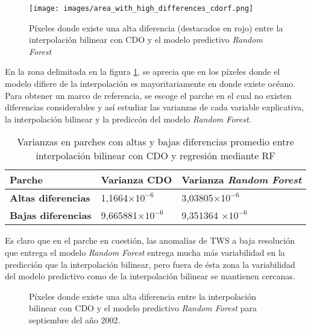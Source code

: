 \begin{figure}[H]
    \centering
          \texttt{[image: images/area\_with\_high\_differences\_cdorf.png]}
          \vskip -0.1in
    \caption[Área donde la interpolación bilinear y el modelo predictivo difieren considerablemente]{Píxeles donde existe una alta diferencia (destacados en rojo) entre la interpolación bilinear con CDO y el modelo predictivo \textit{Random Forest}}
    \label{high_diff}
\end{figure}
En la zona delimitada en la figura \ref{high_diff}, se aprecia que en los píxeles donde el modelo difiere de la interpolación es mayoritariamente en donde existe océano. Para obtener un marco de referencia, se escoge el parche en el cual no existen diferencias 
considerables y así estudiar las varianzas de cada variable explicativa, la interpolación bilinear y la prediccón del modelo  \textit{Random Forest}.

\begin{table}[H] 
    \caption[Varianzas en diferentes parches de CDO y RF]{Varianzas en parches con altas y bajas diferencias promedio entre interpolación bilinear con CDO y regresión mediante RF}
    \begin{tabularx}{0.9\textwidth}{CCC}
    \toprule
    \textbf{Parche}	& \textbf{Varianza CDO}	& \textbf{Varianza \textit{Random Forest}} \\
        \midrule
        \textbf{Altas diferencias}		& 1,1664$\times 10^{-6}$ &3,03805$\times 10^{-6}$  \\
        \textbf{Bajas diferencias}		 & 9,665881$\times 10^{-6}$ & 9,351364 $\times 10^{-6}$\\
        \bottomrule
    \end{tabularx}
\end{table}

Es claro que en el parche en cuestión, las anomalías de TWS a baja resolución que entrega el modelo \textit{Random Forest} entrega mucha más variabilidad en la predicción que la interpolación bilinear, pero fuera de ésta zona
la variabilidad del modelo predictivo como de la interpolación bilinear se mantienen cercanas.

\begin{figure}[H]
    \centering
          \vskip -0.1in
    \caption[Área donde la interpolación bilinear y el modelo predictivo difieren en el periodo 09/2002]{Píxeles donde existe una alta diferencia entre la interpolación bilinear con CDO y el modelo predictivo \textit{Random Forest} para septiembre del año 2002.}
    \label{bilrf2002}
\end{figure}

